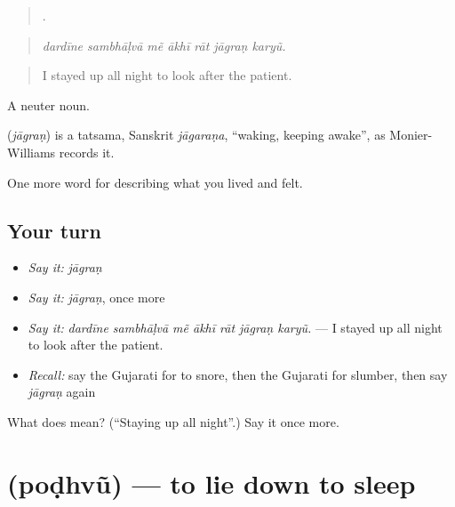 \begin{quote}
      .
\end{quote}

\begin{quote}
\emph{dardīne sambhāḷvā mẽ ākhī rāt jāgraṇ karyũ.}
\end{quote}

\begin{quote}
I stayed up all night to look after the patient.
\end{quote}

A neuter noun.

\begin{cousinweb}
\textbf{} (\emph{jāgraṇ}) is a tatsama, Sanskrit \emph{jāgaraṇa}, \textquotedblleft{}waking, keeping awake\textquotedblright{}, as Monier-Williams records it.
\end{cousinweb}

\begin{grammarlens}[title={What you've built}]
One more word for describing what you lived and felt.
\end{grammarlens}

\subsection*{Your turn}
\begin{itemize}
\raggedright
  \item \emph{Say it:} \emph{jāgraṇ}
  \item \emph{Say it:} \emph{jāgraṇ}, once more
  \item \emph{Say it:} \emph{dardīne sambhāḷvā mẽ ākhī rāt jāgraṇ karyũ.} — I stayed up all night to look after the patient.
  \item \emph{Recall:} say the Gujarati for to snore, then the Gujarati for slumber, then say \emph{jāgraṇ} again
\end{itemize}

\begin{tcolorbox}[breakable,colback=teal!4,colframe=teal!35!black,title={Before you move on}]
What does  mean? (\textquotedblleft{}Staying up all night\textquotedblright{}.) Say it once more.
\end{tcolorbox}
\section[\texorpdfstring{\gu{પોઢવું} (poḍhvũ)}{પોઢવું (poḍhvũ)}]{ (poḍhvũ) — to lie down to sleep}


